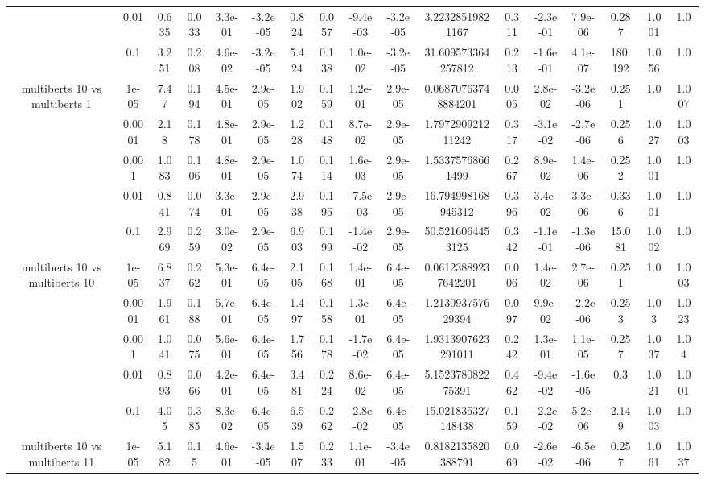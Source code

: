 \begin{tabular}{|c|c|c|c|c|c|c|c|c|c|c|c|c|c|c|c|c|}
 & 0.01 & 0.635 & 0.033 & 3.3e-01 & -3.2e-05 & 0.824 & 0.057 & -9.4e-03 & -3.2e-05 & 3.22328519821167 & 0.311 & -2.3e-01 & 7.9e-06 & 0.287 & 1.001 & 1.0 \\
 & 0.1 & 3.251 & 0.208 & 4.6e-02 & -3.2e-05 & 5.424 & 0.138 & 1.0e-02 & -3.2e-05 & 31.609573364257812 & 0.213 & -1.6e-01 & 4.1e-07 & 180.192 & 1.056 & 1.0 \\
\hline
\multirow{5}{*}{multiberts 10 vs multiberts 1} & 1e-05 & 7.47 & 0.194 & 4.5e-01 & 2.9e-05 & 1.902 & 0.159 & 1.2e-01 & 2.9e-05 & 0.06870763748884201 & 0.005 & 2.8e-02 & -3.2e-06 & 0.251 & 1.0 & 1.007 \\
 & 0.0001 & 2.18 & 0.178 & 4.8e-01 & 2.9e-05 & 1.228 & 0.148 & 8.7e-02 & 2.9e-05 & 1.797290921211242 & 0.317 & -3.1e-02 & -2.7e-06 & 0.256 & 1.027 & 1.003 \\
 & 0.001 & 1.083 & 0.106 & 4.8e-01 & 2.9e-05 & 1.074 & 0.114 & 1.6e-03 & 2.9e-05 & 1.53375768661499 & 0.267 & 8.9e-02 & 1.4e-06 & 0.252 & 1.001 & 1.0 \\
 & 0.01 & 0.841 & 0.074 & 3.3e-01 & 2.9e-05 & 2.938 & 0.195 & -7.5e-03 & 2.9e-05 & 16.794998168945312 & 0.396 & 3.4e-02 & 3.3e-06 & 0.336 & 1.001 & 1.0 \\
 & 0.1 & 2.969 & 0.259 & 3.0e-02 & 2.9e-05 & 6.903 & 0.199 & -1.4e-02 & 2.9e-05 & 50.5216064453125 & 0.342 & -1.1e-01 & -1.3e-06 & 15.081 & 1.002 & 1.0 \\
\hline
\multirow{5}{*}{multiberts 10 vs multiberts 10} & 1e-05 & 6.837 & 0.262 & 5.3e-01 & 6.4e-05 & 2.105 & 0.168 & 1.4e-01 & 6.4e-05 & 0.06123889237642201 & 0.006 & 1.4e-02 & 2.7e-06 & 0.251 & 1.0 & 1.003 \\
 & 0.0001 & 1.961 & 0.188 & 5.7e-01 & 6.4e-05 & 1.497 & 0.158 & 1.3e-01 & 6.4e-05 & 1.213093757629394 & 0.097 & 9.9e-02 & -2.2e-06 & 0.253 & 1.03 & 1.023 \\
 & 0.001 & 1.041 & 0.075 & 5.6e-01 & 6.4e-05 & 1.756 & 0.178 & -1.7e-02 & 6.4e-05 & 1.9313907623291011 & 0.242 & 1.3e-01 & 1.1e-05 & 0.257 & 1.037 & 1.04 \\
 & 0.01 & 0.893 & 0.066 & 4.2e-01 & 6.4e-05 & 3.481 & 0.224 & 8.6e-02 & 6.4e-05 & 5.152378082275391 & 0.462 & -9.4e-02 & -1.6e-05 & 0.3 & 1.021 & 1.001 \\
 & 0.1 & 4.05 & 0.385 & 8.3e-02 & 6.4e-05 & 6.539 & 0.262 & -2.8e-02 & 6.4e-05 & 15.021835327148438 & 0.159 & -2.2e-02 & 5.2e-06 & 2.149 & 1.003 & 1.0 \\
\hline
\multirow{5}{*}{multiberts 10 vs multiberts 11} & 1e-05 & 5.182 & 0.15 & 4.6e-01 & -3.4e-05 & 1.507 & 0.233 & 1.1e-01 & -3.4e-05 & 0.8182135820388791 & 0.069 & -2.6e-02 & -6.5e-06 & 0.257 & 1.061 & 1.037 \\

\end{tabular}
